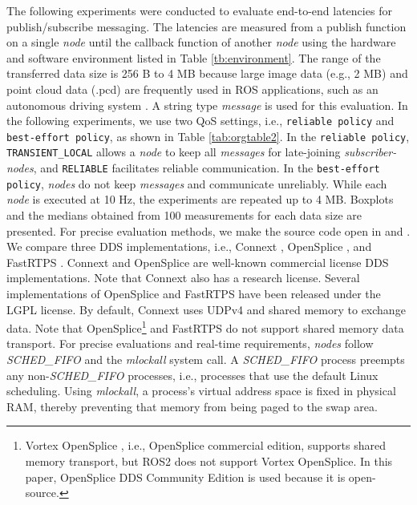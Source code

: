 \documentclass{sig-alternate-05-2015}
\begin{document}
The following experiments were conducted to evaluate end-to-end latencies for publish/subscribe messaging. 
The latencies are measured from a publish function on a single \emph{node} until the callback function of another \emph{node} using the hardware and software environment listed in Table \ref{tb:environment}. 
The range of the transferred data size is 256 B to 4 MB because large image data (e.g., 2 MB) and point cloud data (.pcd) are frequently used in ROS applications, such as an autonomous driving system \cite{kato2015open}.
A string type \emph{message} is used for this evaluation.
In the following experiments, we use two QoS settings, i.e.,  \texttt{reliable policy} and \texttt{best-effort policy}, as shown in Table \ref{tab:orgtable2}. 
In the \texttt{reliable policy}, \texttt{TRANSIENT\_LOCAL} allows a \emph{node} to keep all \emph{messages} for late-joining \emph{subscriber-nodes}, and \texttt{RELIABLE} facilitates reliable communication.
In the \texttt{best-effort policy}, \emph{nodes} do not keep \emph{messages} and communicate unreliably.
While each \emph{node} is executed at 10 Hz, the experiments are repeated up to 4 MB. Boxplots and the medians obtained from 100 measurements for each data size are presented.
For precise evaluation methods, we make the source code open in \cite{m_yuya_ros1} and \cite{m_yuya_ros2}.
We compare three DDS implementations, i.e., Connext \cite{rti_connext}, OpenSplice \cite{ospl_dds_community}, and FastRTPS \cite{fastrtps}. 
Connext and OpenSplice are well-known commercial license DDS implementations. 
Note that Connext also has a research license. 
Several implementations of OpenSplice and FastRTPS have been released under the LGPL license. 
By default, Connext uses UDPv4 and shared memory to exchange data. 
Note that OpenSplice\footnote{Vortex OpenSplice \cite{ospl_vortex}, i.e., OpenSplice commercial edition, supports shared memory transport, but ROS2 does not support Vortex OpenSplice. In this paper, OpenSplice DDS Community Edition is used because it is open-source.} 
and FastRTPS do not support shared memory data transport. 
For precise evaluations and real-time requirements, \emph{nodes} follow \emph{SCHED\_FIFO} \cite{garg2009real} and the \emph{mlockall} system call. 
A \emph{SCHED\_FIFO} process preempts any non-\emph{SCHED\_FIFO} processes, i.e., processes that use the default Linux scheduling.
Using \emph{mlockall}, a process's virtual address space is fixed in physical RAM, thereby preventing that memory from being paged to the swap area.
\end{document}
